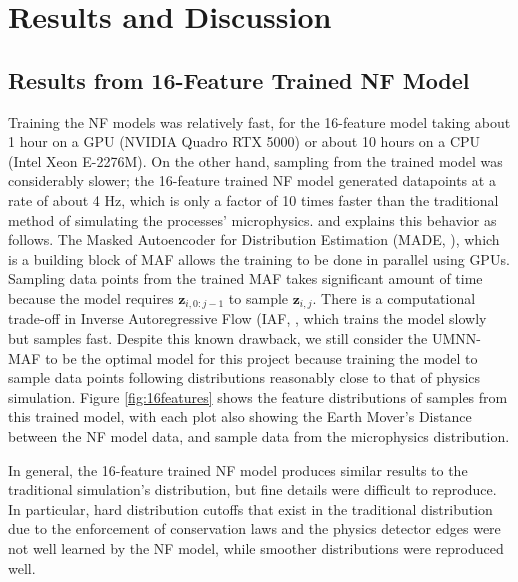 \section{Results and Discussion}
\subsection{Results from 16-Feature Trained NF Model}
Training the NF models was relatively fast, for the 16-feature model taking about 1 hour on a GPU (NVIDIA Quadro RTX 5000) or about 10 hours on a CPU (Intel Xeon E-2276M). On the other hand, sampling from the trained model was considerably slower; the 16-feature trained NF model generated datapoints at a rate of about 4 Hz, which is only a factor of 10 times faster than the traditional method of simulating the processes' microphysics. \citet{NEURIPS2019_2a084e55} and \citet{papamakarios2018masked} explains this behavior as follows. The Masked Autoencoder for Distribution Estimation (MADE, \citet{pmlr-v37-germain15}), which is a building block of MAF allows the training to be done in parallel using GPUs. Sampling data points from the trained MAF takes significant amount of time because the model requires $\mathbf{z}_{i,0:j-1}$ to sample $\mathbf{z}_{i,j}$. There is a computational trade-off in Inverse Autoregressive Flow (IAF, \citet{NIPS2016_ddeebdee}, which trains the model slowly but samples fast. Despite this known drawback, we still consider the UMNN-MAF to be the optimal model for this project because training the model to sample data points following distributions reasonably close to that of physics simulation. Figure \ref{fig:16features} shows the feature distributions of samples from this trained model, with each plot also showing the Earth Mover's Distance between the NF model data, and sample data from the microphysics distribution.


In general, the 16-feature trained NF model produces similar results to the traditional simulation's distribution, but fine details were difficult to reproduce. In particular, hard distribution cutoffs that exist in the traditional distribution due to the enforcement of conservation laws and the physics detector edges were not well learned by the NF model, while smoother distributions were reproduced well.

